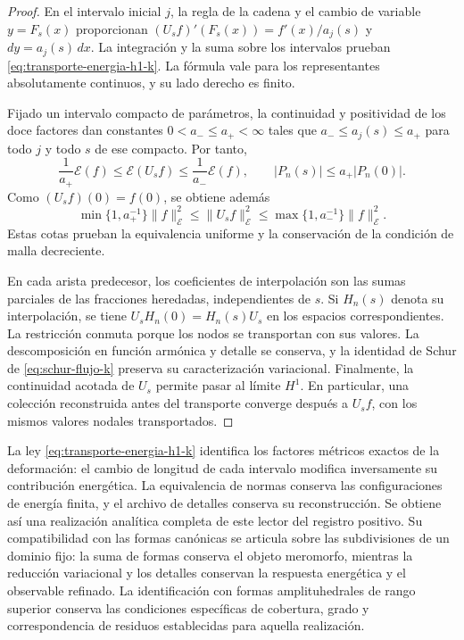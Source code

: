 \begin{proof}
En el intervalo inicial \(j\), la regla de la cadena y el cambio
de variable \(y=F_s(x)\) proporcionan
\((U_sf)'(F_s(x))=f'(x)/a_j(s)\) y \(dy=a_j(s)\,dx\).
La integración y la suma sobre los intervalos prueban
\eqref{eq:transporte-energia-h1-k}. La fórmula vale para los
representantes absolutamente continuos, y su lado derecho es finito.

Fijado un intervalo compacto de parámetros, la continuidad y positividad
de los doce factores dan constantes \(0<a_-\leq a_+<\infty\)
tales que \(a_-\leq a_j(s)\leq a_+\) para todo \(j\) y
todo \(s\) de ese compacto. Por tanto,
\[
 \frac1{a_+}\mathcal E(f)
 \leq\mathcal E(U_sf)
 \leq\frac1{a_-}\mathcal E(f),
 \qquad
 |P_n(s)|\leq a_+|P_n(0)|.
\]
Como \((U_sf)(0)=f(0)\), se obtiene además
\[
 \min\{1,a_+^{-1}\}\|f\|_{\mathcal E}^2
 \leq\|U_sf\|_{\mathcal E}^2
 \leq\max\{1,a_-^{-1}\}\|f\|_{\mathcal E}^2.
\]
Estas cotas prueban la equivalencia uniforme y la conservación de la
condición de malla decreciente.

En cada arista predecesor, los coeficientes de interpolación son las sumas
parciales de las fracciones heredadas, independientes de \(s\).
Si \(H_n(s)\) denota su interpolación, se tiene
\(U_sH_n(0)=H_n(s)U_s\) en los espacios correspondientes.
La restricción conmuta porque los nodos se transportan con sus valores.
La descomposición en función armónica y detalle se conserva, y la
identidad de Schur de \eqref{eq:schur-flujo-k} preserva su
caracterización variacional. Finalmente, la continuidad acotada de
\(U_s\) permite pasar al límite \(H^1\). En particular, una
colección reconstruida antes del transporte converge después a \(U_sf\),
con los mismos valores nodales transportados.
\end{proof}

La ley \eqref{eq:transporte-energia-h1-k} identifica los factores
métricos exactos de la deformación: el cambio de longitud de cada
intervalo modifica inversamente su contribución energética. La
equivalencia de normas conserva las configuraciones de energía finita,
y el archivo de detalles conserva su reconstrucción. Se obtiene así una
realización analítica completa de este lector del registro positivo.
Su compatibilidad con las formas canónicas se articula sobre las
subdivisiones de un dominio fijo: la suma de formas conserva el objeto
meromorfo, mientras la reducción variacional y los detalles conservan
la respuesta energética y el observable refinado. La identificación
con formas amplituhedrales de rango superior conserva las condiciones
específicas de cobertura, grado y correspondencia de residuos
establecidas para aquella realización.
